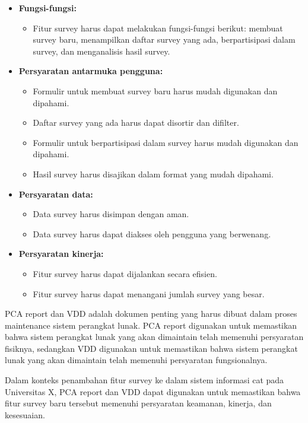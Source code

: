 \documentclass[12pt]{article}
\begin{document}
\begin{itemize}
    \item \textbf{Fungsi-fungsi:}
    \begin{itemize}
        \item Fitur survey harus dapat melakukan fungsi-fungsi berikut: membuat survey baru, menampilkan daftar survey yang ada, berpartisipasi dalam survey, dan menganalisis hasil survey.
    \end{itemize}
    \item \textbf{Persyaratan antarmuka pengguna:}
    \begin{itemize}
        \item Formulir untuk membuat survey baru harus mudah digunakan dan dipahami.
        \item Daftar survey yang ada harus dapat disortir dan difilter.
        \item Formulir untuk berpartisipasi dalam survey harus mudah digunakan dan dipahami.
        \item Hasil survey harus disajikan dalam format yang mudah dipahami.
    \end{itemize}
    \item \textbf{Persyaratan data:}
    \begin{itemize}
        \item Data survey harus disimpan dengan aman.
        \item Data survey harus dapat diakses oleh pengguna yang berwenang.
    \end{itemize}
    \item \textbf{Persyaratan kinerja:}
    \begin{itemize}
        \item Fitur survey harus dapat dijalankan secara efisien.
        \item Fitur survey harus dapat menangani jumlah survey yang besar.
    \end{itemize}
\end{itemize}



PCA report dan VDD adalah dokumen penting yang harus dibuat dalam proses maintenance sistem perangkat lunak. PCA report digunakan untuk memastikan bahwa sistem perangkat lunak yang akan dimaintain telah memenuhi persyaratan fisiknya, sedangkan VDD digunakan untuk memastikan bahwa sistem perangkat lunak yang akan dimaintain telah memenuhi persyaratan fungsionalnya.

Dalam konteks penambahan fitur survey ke dalam sistem informasi cat pada Universitas X, PCA report dan VDD dapat digunakan untuk memastikan bahwa fitur survey baru tersebut memenuhi persyaratan keamanan, kinerja, dan kesesuaian.



\printbibliography[title=Daftar Pustaka]
\end{document}
